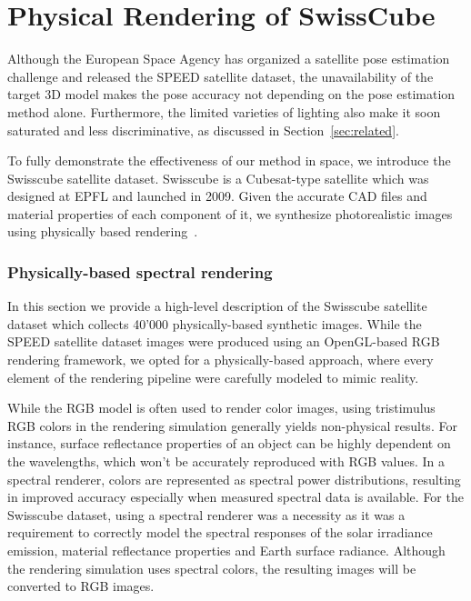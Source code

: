 
\section{Physical Rendering of SwissCube}
\label{sec:appendix}

Although the European Space Agency has organized a satellite pose estimation challenge and released the SPEED satellite dataset, the unavailability of the target 3D model makes the pose accuracy not depending on the pose estimation method alone. Furthermore, the limited varieties of lighting also make it soon saturated and less discriminative, as discussed in Section~\ref{sec:related}.

To fully demonstrate the effectiveness of our method in space, we introduce the Swisscube satellite dataset. Swisscube is a Cubesat-type satellite which was designed at EPFL and launched in 2009. Given the accurate CAD files and material properties of each component of it, we synthesize photorealistic images using physically based rendering~\cite{xx}.




\subsubsection{Physically-based spectral rendering}

In this section we provide a high-level description of the Swisscube satellite dataset which collects 40'000  physically-based synthetic images. While the SPEED satellite dataset images were produced using an OpenGL-based RGB rendering framework, we opted for a physically-based approach, where every element of the rendering pipeline were carefully modeled to mimic reality.

While the RGB model is often used to render color images, using tristimulus RGB colors in the rendering simulation generally yields non-physical results. For instance, surface reflectance properties of an object can be highly dependent on the wavelengths, which won't be accurately reproduced with RGB values. In a spectral renderer, colors are represented as spectral power distributions, resulting in improved accuracy especially when measured spectral data is available. For the Swisscube dataset, using a spectral renderer was a necessity as it was a requirement to correctly model the spectral responses of the solar irradiance emission, material reflectance properties and Earth surface radiance. Although the rendering simulation uses spectral colors, the resulting images will be converted to RGB images.

